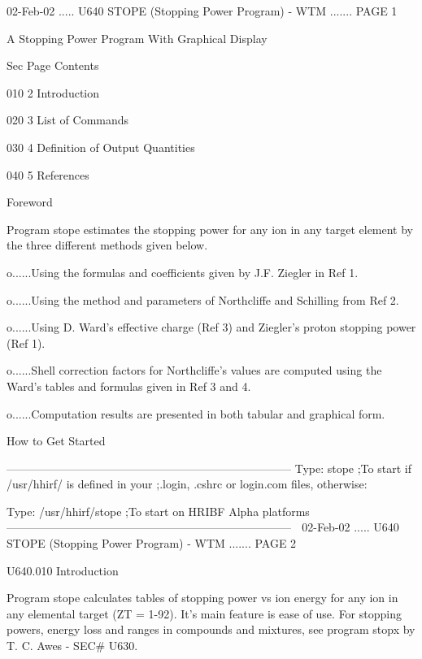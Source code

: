    02-Feb-02 ..... U640  STOPE (Stopping Power Program) - WTM ....... PAGE   1
 
 
                 A Stopping Power Program With Graphical Display
 
   Sec Page Contents
 
   010   2  Introduction
 
   020   3  List of Commands
 
   030   4  Definition of Output Quantities
 
   040   5  References
 
 
 
                                    Foreword
 
   Program  stope  estimates  the  stopping  power  for  any ion in any target
   element by the three different methods given below.
 
   o......Using the formulas and coefficients given by J.F. Ziegler in Ref 1.
 
   o......Using the method and parameters of Northcliffe  and  Schilling  from
          Ref 2.
 
   o......Using  D.  Ward's  effective  charge  (Ref  3)  and Ziegler's proton
          stopping power (Ref 1).
 
   o......Shell correction  factors  for  Northcliffe's  values  are  computed
          using the Ward's tables and formulas given in Ref 3 and 4.
 
   o......Computation  results  are  presented  in  both tabular and graphical
          form.
 
 
                               How to Get Started
 
   ---------------------------------------------------------------------------
   Type:  stope              ;To start if /usr/hhirf/ is defined in your
                             ;.login, .cshrc or login.com files, otherwise:
 
   Type:  /usr/hhirf/stope   ;To start on HRIBF Alpha platforms
   ---------------------------------------------------------------------------
    
   02-Feb-02 ..... U640  STOPE (Stopping Power Program) - WTM ....... PAGE   2
 
   U640.010  Introduction
 
   Program stope calculates tables of stopping power vs  ion  energy  for  any
   ion  in any elemental target (ZT = 1-92). It's main feature is ease of use.
   For stopping powers, energy loss and ranges in compounds and mixtures,  see
   program stopx by T. C. Awes - SEC# U630.
 
